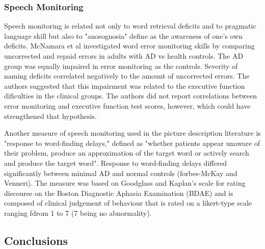 \documentclass[12pt, twoside, a4paper]{article}
\begin{document}
\subsubsection{Speech Monitoring}
Speech monitoring is related not only to word retrieval deficits and to pragmatic language skill but also to "anosognosia" define as the awareness of one's own deficits. McNamara et al investigated word error monitoring skills by comparing uncorrected and repaid errors in adults with AD vs health controls. The AD group was equally impaired in error monitoring as the controls. Severity of naming deficits correlated negatively to the amount of uncorrected errors. The authors suggested that this impairment was related to the executive function dificulties in the clinical groups. The authors did not report correlations between error monitoring and executive function test scores, however, which could have strengthened that hypothesis.
\par
Another measure of speech monitoring used in the picture description literature is "response to word-finding delays," defined as "whether patients appear unaware of their problem, produce an approximation of the target word or actively search and produce the target word". Response to word-finding delays differed significantly between minimal  AD and normal controls (forbes-McKay and Venneri). The measure was based on Goodglass and Kaplan's scale for rating discourse on the Boston Diagnostic Aphasia Examination (BDAE) and is composed of clinical judgement of behaviour that is rated on a likert-type scale ranging fdrom 1 to 7 (7 being no abnormality).
\par
\subsection{Conclusions}
\end{document}
